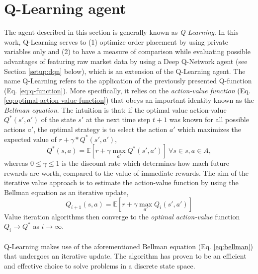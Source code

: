 \section{Q-Learning agent}
\label{setup:q-learning}
The agent described in this section is generally known as \textit{Q-Learning}\cite{watkins1992q}.
In this work, Q-Learning serves to (1) optimize order placement by using private variables only and (2) to have a measure of comparison while evaluating possible advantages of featuring raw market data by using a Deep Q-Network agent (see Section \ref{setup:dqn} below), which is an extension of the Q-Learning agent.
The name Q-Learning refers to the application of the previously presented Q-function (Eq. \ref{eq:q-function}).
More specifically, it relies on the \textit{action-value function} (Eq. \ref{eq:optimal-action-value-function}) that obeys an important identity known as the \textit{Bellman equation}.
The intuition is that: if the optimal value action-value $Q^*(s',a')$ of the state $s'$ at the next time step $t+1$ was known for all possible actions $a'$, the optimal strategy is to select the action $a'$ which maximizes the expected value of $r+\gamma*Q^*(s',a')$,
\begin{equation}\label{eq:bellman}
Q^*(s,a)=\mathbb{E}[r+\gamma \max_{a'} Q^*(s',a')] \ \forall{s}\in{s},  a\in{A},
\end{equation}
whereas $0 \le \gamma \le 1$ is the discount rate which determines how mach future rewards are worth, compared to the value of immediate rewards.
The aim of the iterative value approach is to estimate the action-value function by using the Bellman equation as an iterative update,
\begin{equation}
Q_{i+1}(s,a)=\mathbb{E}[r+\gamma \max_{a'}Q_{i}(s',a')]
\end{equation}
Value iteration algorithms then converge to the \textit{optimal action-value} function $Q_{i} \rightarrow Q^*$ as $i \rightarrow \infty$. \cite{sutton1998reinforcement}
\\
\\
Q-Learning makes use of the aforementioned Bellman equation (Eq. \ref{eq:bellman}) that undergoes an iterative update.
The algorithm has proven to be an efficient and effective choice to solve problems in a discrete state space.
